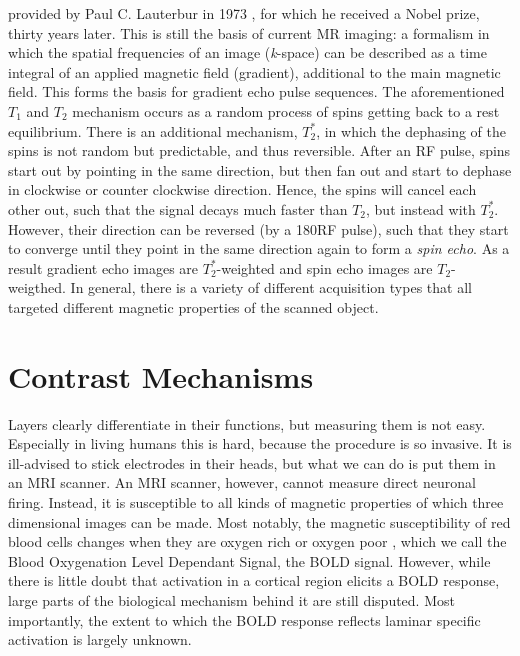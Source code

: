  provided by Paul C. Lauterbur in 1973 \cite{Lauterbur1973}, for which he received a Nobel prize, thirty years later. This is still the basis of current MR imaging: a formalism in which the spatial frequencies of an image (\emph{k}-space) can be described as a time integral of an applied magnetic field (gradient), additional to the main magnetic field. %
 This forms the basis for gradient echo pulse sequences.
The aforementioned $T_1$ and $T_2$ mechanism occurs as a random process of spins getting back to a rest equilibrium. There is an additional mechanism, $T_2^*$, in which the dephasing of the spins is not random but predictable, and thus reversible. After an RF pulse, spins start out by pointing in the same direction, but then fan out and start to dephase in clockwise or counter clockwise direction. Hence, the spins will cancel each other out, such that the signal decays much faster than $T_2$, but instead with $T_2^*$. However, their direction can be reversed (by a 180\textdegree RF pulse), such that they start to converge until they point in the same direction again to form a \emph{spin echo}. As a result gradient echo images are $T_2^*$-weighted and spin echo images are $T_2$-weigthed. In general, there is a variety of different acquisition types that all targeted different magnetic properties of the scanned object. 

\section*{Contrast Mechanisms}
Layers clearly differentiate in their functions, but measuring them is not easy. Especially in living humans this is hard, because the procedure is so invasive. It is ill-advised to stick electrodes in their heads, but what we can do is put them in an MRI scanner. An MRI scanner, however, cannot measure direct neuronal firing. Instead, it is susceptible to all kinds of magnetic properties of which three dimensional images can be made. Most notably, the magnetic susceptibility of red blood cells changes when they are oxygen rich or oxygen poor \cite{Ogawa1990}, which we call the Blood Oxygenation Level Dependant Signal, the BOLD signal. However, while there is little doubt that activation in a cortical region elicits a BOLD response, large parts of the biological mechanism behind it are still disputed. Most importantly, the extent to which the BOLD response reflects laminar specific activation is largely unknown.

